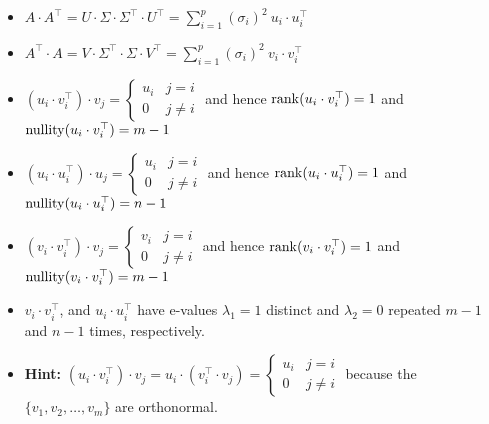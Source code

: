 \begin{tcolorbox}[title=\textbf{Exercises or Facts:}]

\begin{itemize}
\item $A \cdot A^\top  =U \cdot \Sigma \cdot \Sigma^\top \cdot U^\top = \sum_{i=1}^p  (\sigma_i)^2 ~u_i \cdot u_i^\top $

\item $A^\top \cdot A =V \cdot \Sigma^\top \cdot \Sigma \cdot V^\top = \sum_{i=1}^p  (\sigma_i)^2 ~v_i \cdot v_i^\top $


\item $\left(  u_i \cdot  v_i^\top\right) \cdot v_j = \begin{cases} u_i & j=i \\ 0 & j \neq i\end{cases}  $ and hence $\mathrm{rank}(u_i \cdot  v_i^\top)=1$ and $\mathrm{nullity}(u_i \cdot  v_i^\top)=m-1$

\item $\left(  u_i \cdot  u_i^\top\right) \cdot u_j = \begin{cases} u_i & j=i \\ 0 & j \neq i\end{cases}  $ and hence $\mathrm{rank}(u_i \cdot  u_i^\top)=1$ and $\mathrm{nullity}(u_i \cdot  u_i^\top)=n-1$

\item $\left(  v_i \cdot  v_i^\top\right) \cdot v_j = \begin{cases} v_i & j=i \\ 0 & j \neq i\end{cases}  $ and hence $\mathrm{rank}(v_i \cdot  v_i^\top)=1$ and $\mathrm{nullity}(v_i \cdot  v_i^\top)=m-1$

\item $v_i \cdot v_i^\top$, and  $u_i \cdot u_i^\top$ have e-values $\lambda_1=1$ distinct and $\lambda_2=0$ repeated $m-1$ and $n-1$ times, respectively. 

\item \textbf{Hint:} $\left(  u_i \cdot  v_i^\top\right) \cdot v_j =u_i \cdot  \left(   v_i^\top \cdot v_j\right)  = \begin{cases} u_i & j=i \\ 0 & j \neq i\end{cases}  $ because the $\{v_1, v_2, \ldots, v_m \}$ are orthonormal.

\end{itemize}

\end{tcolorbox}

